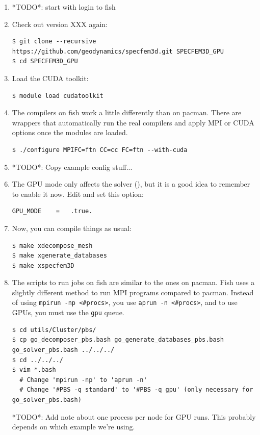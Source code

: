 \documentclass[10pt,fleqn,letterpaper]{article}
\begin{document}
\begin{enumerate}
\item *TODO*: start with login to fish

\item Check out version XXX again:
\begin{lstlisting}
$ git clone --recursive https://github.com/geodynamics/specfem3d.git SPECFEM3D_GPU
$ cd SPECFEM3D_GPU
\end{lstlisting}

\item Load the CUDA toolkit:
\begin{lstlisting}
$ module load cudatoolkit
\end{lstlisting}

\item The compilers on fish work a little differently than on pacman. There are
      wrappers that automatically run the real compilers and apply MPI or CUDA
      options once the modules are loaded.

\begin{lstlisting}
$ ./configure MPIFC=ftn CC=cc FC=ftn --with-cuda
\end{lstlisting}

\item *TODO*: Copy example config stuff...

\item The GPU mode only affects the solver (), but it is a good
      idea to remember to enable it now. Edit  and set this
      option:
\begin{lstlisting}
GPU_MODE    =   .true.
\end{lstlisting}

\item Now, you can compile things as usual:
\begin{lstlisting}
$ make xdecompose_mesh
$ make xgenerate_databases
$ make xspecfem3D
\end{lstlisting}

\item The scripts to run jobs on fish are similar to the ones on pacman. Fish
      uses a slightly different method to run MPI programs compared to pacman.
      Instead of using \lstinline{mpirun -np <#procs>}, you use
      \lstinline{aprun -n <#procs>}, and to use GPUs, you must use the \texttt{gpu}
      queue.
\begin{lstlisting}
$ cd utils/Cluster/pbs/
$ cp go_decomposer_pbs.bash go_generate_databases_pbs.bash go_solver_pbs.bash ../../../
$ cd ../../../
$ vim *.bash
  # Change 'mpirun -np' to 'aprun -n'
  # Change '#PBS -q standard' to '#PBS -q gpu' (only necessary for go_solver_pbs.bash)
\end{lstlisting}
*TODO*: Add note about one process per node for GPU runs. This probably depends
on which example we're using.


\end{enumerate}
\end{document}
